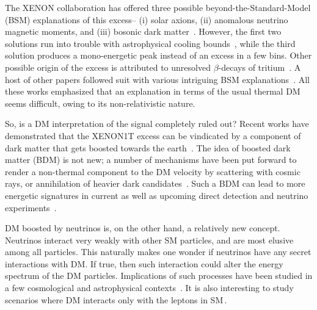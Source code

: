 \documentclass[prd,aps,twocolumn,tightenlines,notitlepage,nofootinbib,preprintnumbers,letterpaper,superscriptaddress]{revtex4-2}
\begin{document}
The XENON collaboration has offered three possible beyond-the-Standard-Model (BSM) explanations of this excess-- (i) solar axions, (ii) anomalous neutrino magnetic moments, and (iii) bosonic dark matter~\cite{Aprile_2020}. However, the first two solutions run into trouble with astrophysical cooling bounds~\cite{2019arXiv191010568A}, while the third solution produces a mono-energetic peak instead of an excess in a few bins. Other possible origin of the excess is attributed to unresolved $\beta$-decays of tritium~\cite{Aprile_2020}. A host of other papers followed suit with various intriguing BSM explanations~\cite{Smirnov:2020zwf,Bell:2020bes,Davoudiasl:2020ypv,Boehm:2020ltd,Arcadi:2020zni,Borah:2020jzi,Chala:2020pbn,Lindner:2020kko,DiLuzio:2020jjp,Bally:2020yid,Gao:2020wer,Bramante:2020zos,Cacciapaglia:2020kbf,Miranda:2020kwy,Davoudiasl:2020ypv,Karozas:2020pun,Zu:2020bsx,Farzan:2020llg,Khan:2020vaf,Dutta:2021nsy,McKeen:2020vpf,Jho:2021rmn}. 
All these works emphasized that an explanation in terms of the usual thermal DM seems difficult, owing to its non-relativistic nature. 

So, is a DM interpretation of the signal completely ruled out? Recent works have demonstrated that the XENON1T excess can be vindicated by a component of dark matter that gets boosted towards the earth~\cite{Kannike:2020agf,Fornal_2020,Alhazmi:2020fju}. The idea of boosted dark matter (BDM) is not new; a number of mechanisms have been put forward to render a non-thermal component to the DM velocity by scattering with cosmic rays, or annihilation of heavier dark candidates~\cite{DEramo:2010keq,Agashe:2014yua,Berger:2014sqa,Ema:2018bih,Bringmann:2018cvk,Cappiello:2018hsu,Yin:2018yjn}. Such a BDM can lead to more energetic signatures in current as well as upcoming direct detection and neutrino experiments~\cite{Bringmann:2018cvk,McKeen:2018pbb,Dent:2019krz,Ema:2020ulo}.

DM boosted by neutrinos is, on the other hand, a relatively new concept. Neutrinos interact very weakly with other SM particles, and are most elusive among all particles. This naturally makes one wonder if neutrinos have any secret interactions with DM. If true, then such interaction could alter the energy spectrum of the DM particles.  Implications of such processes have been studied in a few cosmological and astrophysical contexts~\cite{Campo:2017nwh,Ghosh:2019tab, Zhang:2020nis, Jho:2021rmn}. It is also interesting to study scenarios where DM interacts only with the leptons in SM\,\cite{Fox_2009,Bernabei_2008,Chang_2014}.
\end{document}
